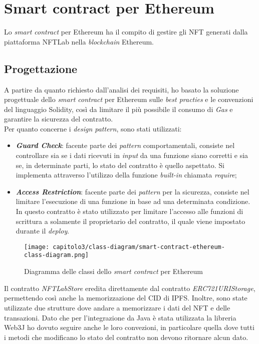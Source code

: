 
\section{Smart contract per Ethereum}
Lo \textit{smart contract} per Ethereum ha il compito di gestire gli NFT generati dalla piattaforma NFTLab nella \textit{blockchain} Ethereum.

\subsection{Progettazione}
A partire da quanto richiesto dall'analisi dei requisiti, ho basato la soluzione progettuale dello \textit{smart contract} per Ethereum sulle \textit{best practies} e le convenzioni del linguaggio Solidity, così da limitare il più possibile il consumo di \textit{Gas} e garantire la sicurezza del contratto. \\

\noindent Per quanto concerne i \textit{design pattern}, sono stati utilizzati:
\begin{itemize}
  \item \textbf{\textit{Guard Check}}: facente parte dei \textit{pattern} comportamentali, consiste nel controllare sia se i dati ricevuti in \textit{input} da una funzione siano corretti e sia se, in determinate parti, lo stato del contratto è quello aspettato. Si implementa attraverso l'utilizzo della funzione \textit{built-in} chiamata \textit{require};
  \item \textbf{\textit{Access Restriction}}: facente parte dei \textit{pattern} per la sicurezza, consiste nel limitare l'esecuzione di una funzione in base ad una determinata condizione. In questo contratto è stato utilizzato per limitare l'accesso alle funzioni di scrittura a solamente il proprietario del contratto, il quale viene impostato durante il \textit{deploy}.
\end{itemize}

\clearpage

\begin{figure}[h!]
  \centering
  \texttt{[image: capitolo3/class-diagram/smart-contract-ethereum-class-diagram.png]}
  \caption{Diagramma delle classi dello \textit{smart contract} per Ethereum}
\end{figure}

Il contratto \textit{NFTLabStore} eredita direttamente dal contratto \textit{ERC721URIStorage}, permettendo così anche la memorizzazione del CID di IPFS. Inoltre, sono state utilizzate due strutture dove andare a memorizzare i dati del NFT e delle transazioni. Dato che per l'integrazione da Java è stata utilizzata la libreria Web3J ho dovuto seguire anche le loro convezioni, in particolare quella dove tutti i metodi che modificano lo stato del contratto non devono ritornare alcun dato.

